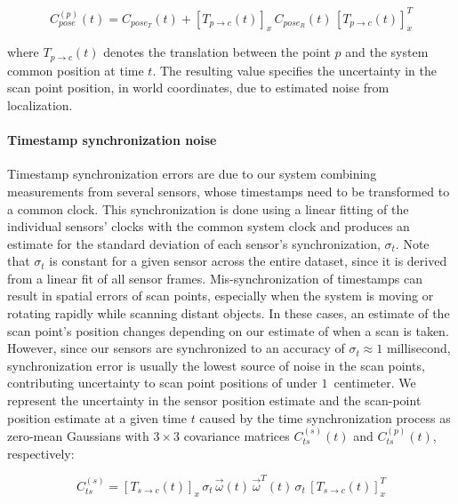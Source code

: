 \documentclass[12pt,onecolumn,oneside]{book}
\begin{document}
\begin{equation}
C^{(p)}_{pose}(t) = C_{pose_T}(t) + \left[ T_{p\rightarrow c}(t) \right]_x \, C_{pose_R}(t) \, \left[ T_{p\rightarrow c}(t) \right]_x^T
\end{equation}

where $T_{p\rightarrow c}(t)$ denotes the translation between the point $p$ and the system common position at time $t$.  The resulting value specifies the uncertainty in the scan point position, in world coordinates, due to estimated noise from localization.

\paragraph*{Timestamp synchronization noise}
Timestamp synchronization errors are due to our system combining measurements from several sensors, whose timestamps need to be transformed to a common clock.  This synchronization is done using a linear fitting of the individual sensors' clocks with the common system clock and produces an estimate for the standard deviation of each sensor's synchronization, $\sigma_t$.  Note that $\sigma_t$ is constant for a given sensor across the entire dataset, since it is derived from a linear fit of all sensor frames.  Mis-synchronization of timestamps can result in spatial errors of scan points, especially when the system is moving or rotating rapidly while scanning distant objects.  In these cases, an estimate of the scan point's position changes depending on our estimate of when a scan is taken.  However, since our sensors are synchronized to an accuracy of $\sigma_t \approx 1$ millisecond, synchronization error is usually the lowest source of noise in the scan points, contributing uncertainty to scan point positions of under $1$~centimeter.  We represent the uncertainty in the sensor position estimate and the scan-point position estimate at a given time $t$ caused by the time synchronization process as zero-mean Gaussians with $3 \times 3$ covariance matrices $C^{(s)}_{ts}(t)$ and $C^{(p)}_{ts}(t)$, respectively:

\begin{equation}
C^{(s)}_{ts} = \left[ T_{s\rightarrow c}(t) \right]_x \, \sigma_{t} \, \vec{\omega}(t) \, \vec{\omega}^T(t) \, \sigma_{t} \, \left[ T_{s\rightarrow c}(t) \right]_x^T
\end{equation}
\end{document}
